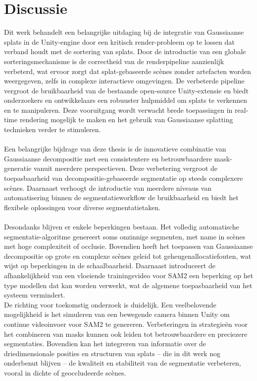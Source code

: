 \documentclass[twocolumn]{article}
\begin{document}
	\section{Discussie}
Dit werk behandelt een belangrijke uitdaging bij de integratie van Gaussiaanse splats in de Unity-engine door een kritisch render-probleem op te lossen dat verband houdt met de sortering van splats. Door de introductie van een globale sorteringsmechanisme is de correctheid van de renderpipeline aanzienlijk verbeterd, wat ervoor zorgt dat splat-gebaseerde scènes zonder artefacten worden weergegeven, zelfs in complexe interactieve omgevingen. De verbeterde pipeline vergroot de bruikbaarheid van de bestaande open-source Unity-extensie en biedt onderzoekers en ontwikkelaars een robuuster hulpmiddel om splats te verkennen en te manipuleren. Deze vooruitgang wordt verwacht brede toepassingen in real-time rendering mogelijk te maken en het gebruik van Gaussiaanse splatting technieken verder te stimuleren.
\\\\
Een belangrijke bijdrage van deze thesis is de innovatieve combinatie van Gaussiaanse decompositie met een consistentere en betrouwbaardere mask-generatie vanuit meerdere perspectieven. Deze verbetering vergroot de toepasbaarheid van decompositie-gebaseerde segmentatie op steeds complexere scènes. Daarnaast verhoogt de introductie van meerdere niveaus van automatisering binnen de segmentatieworkflow de bruikbaarheid en biedt het flexibele oplossingen voor diverse segmentatietaken.
\\\\
Desondanks blijven er enkele beperkingen bestaan. Het volledig automatische segmentatie-algoritme genereert soms onzinnige segmenten, met name in scènes met hoge complexiteit of occlusie. Bovendien heeft het toepassen van Gaussiaanse decompositie op grote en complexe scènes geleid tot geheugenallocatiefouten, wat wijst op beperkingen in de schaalbaarheid. Daarnaast introduceert de afhankelijkheid van een vloeiende trainingsvideo voor SAM2 een beperking op het type modellen dat kan worden verwerkt, wat de algemene toepasbaarheid van het systeem vermindert.
\\
De richting voor toekomstig onderzoek is duidelijk. Een veelbelovende mogelijkheid is het simuleren van een bewegende camera binnen Unity om continue videoinvoer voor SAM2 te genereren. Verbeteringen in strategieën voor het combineren van masks kunnen ook leiden tot betrouwbaardere en preciezere segmentaties. Bovendien kan het integreren van informatie over de driedimensionale posities en structuren van splats – die in dit werk nog onderbenut blijven – de kwaliteit en stabiliteit van de segmentatie verbeteren, vooral in dichte of geoccludeerde scènes.
\end{document}
